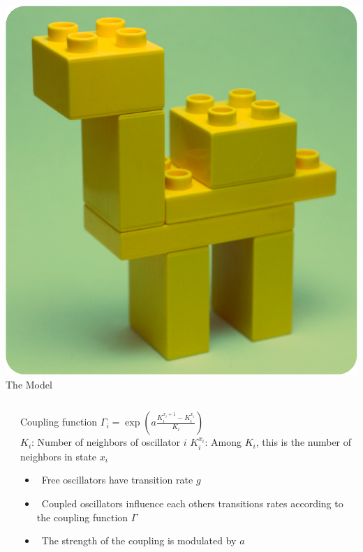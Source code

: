\documentclass[serif,mathserif]{beamer}
\begin{document}
\begin{frame}{\includegraphics[height=0.06\textheight]{lego-model.eps}\hspace{0.25cm} The Model}
    \begin{columns}[t]
        \begin{column}{0.5\textwidth}
            \centering
        \end{column}
        \begin{column}{0.6\textwidth}
            Coupling function $\Gamma_i = \exp \left( a \frac{K_i^{x_i + 1} - K_i^{x_i}}{K_i} \right)$ \\
            $K_{i}$: Number of neighbors of oscillator $i$
            $K_i^{x_i}$: Among $K_i$, this is the number of neighbors in state $x_i$ \\
            \begin{itemize}
                \vspace{0.25cm}
                \item \ \pause Free oscillators have transition rate $g$
                \vspace{0.25cm}
                \item \ \pause Coupled oscillators influence each others transitions rates according to the coupling function $\Gamma$
                \vspace{0.25cm}
                \item \ \pause The strength of the coupling is modulated by $a$
            \end{itemize}
        \end{column}
    \end{columns}
\end{frame}
\end{document}

